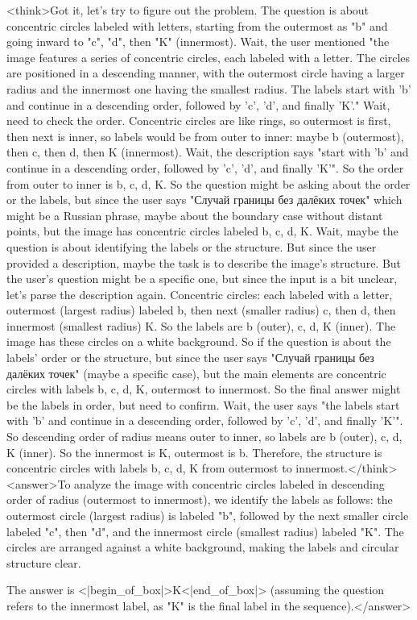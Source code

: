 <think>Got it, let's try to figure out the problem. The question is about concentric circles labeled with letters, starting from the outermost as "b" and going inward to "c", "d", then "K" (innermost). Wait, the user mentioned "the image features a series of concentric circles, each labeled with a letter. The circles are positioned in a descending manner, with the outermost circle having a larger radius and the innermost one having the smallest radius. The labels start with 'b' and continue in a descending order, followed by 'c', 'd', and finally 'K'." Wait, need to check the order. Concentric circles are like rings, so outermost is first, then next is inner, so labels would be from outer to inner: maybe b (outermost), then c, then d, then K (innermost). Wait, the description says "start with 'b' and continue in a descending order, followed by 'c', 'd', and finally 'K'". So the order from outer to inner is b, c, d, K. So the question might be asking about the order or the labels, but since the user says "Случай границы без далёких точек" which might be a Russian phrase, maybe about the boundary case without distant points, but the image has concentric circles labeled b, c, d, K. Wait, maybe the question is about identifying the labels or the structure. But since the user provided a description, maybe the task is to describe the image's structure. But the user's question might be a specific one, but since the input is a bit unclear, let's parse the description again. Concentric circles: each labeled with a letter, outermost (largest radius) labeled b, then next (smaller radius) c, then d, then innermost (smallest radius) K. So the labels are b (outer), c, d, K (inner). The image has these circles on a white background. So if the question is about the labels' order or the structure, but since the user says "Случай границы без далёких точек" (maybe a specific case), but the main elements are concentric circles with labels b, c, d, K, outermost to innermost. So the final answer might be the labels in order, but need to confirm. Wait, the user says "the labels start with 'b' and continue in a descending order, followed by 'c', 'd', and finally 'K'". So descending order of radius means outer to inner, so labels are b (outer), c, d, K (inner). So the innermost is K, outermost is b. Therefore, the structure is concentric circles with labels b, c, d, K from outermost to innermost.</think><answer>To analyze the image with concentric circles labeled in descending order of radius (outermost to innermost), we identify the labels as follows: the outermost circle (largest radius) is labeled "b", followed by the next smaller circle labeled "c", then "d", and the innermost circle (smallest radius) labeled "K". The circles are arranged against a white background, making the labels and circular structure clear.  

The answer is <|begin_of_box|>K<|end_of_box|> (assuming the question refers to the innermost label, as "K" is the final label in the sequence).</answer>